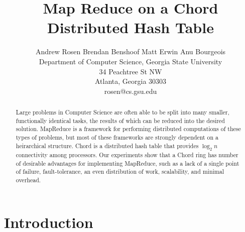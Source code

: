 \documentclass[conference, compsocconf, letterpaper]{IEEEtran}
\title{Map Reduce on a Chord Distributed Hash Table}
\author{
Andrew Rosen \qquad Brendan Benshoof \qquad Matt Erwin \qquad Anu Bourgeois  \\Department of Computer Science, Georgia State University\\ 34 Peachtree St NW \\ Atlanta, Georgia 30303\\  rosen@cs.gsu.edu }
\begin{document}
\maketitle

\begin{abstract}

Large problems in Computer Science are often able to be split into many smaller, functionally identical tasks, the results of which can be reduced into the desired solution.  MapReduce is a framework for 
performing distributed computations of these types of problems, but most of these frameworks are strongly dependent on a heirarchical structure.  Chord is a distributed hash table that provides $\log_{2}n$ connectivity among processors.  Our experiments show that a Chord ring has number of desirable advantages for implementing MapReduce, such as a lack of a single point of failure, fault-tolerance, an even distribution of work, scalability, and minimal overhead.


\end{abstract}
\section{Introduction}
\end{document}

